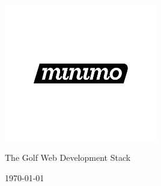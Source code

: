 \begin{titlepage}

\begin{center}

\vspace{4in}

\includegraphics[width=0.5\textwidth]{img/logo}

\vspace{1.25in}

{\LARGE The Golf Web Development Stack}

\vspace{2.25in}

{\Large \today}

\vfill

\end{center}

\end{titlepage}
